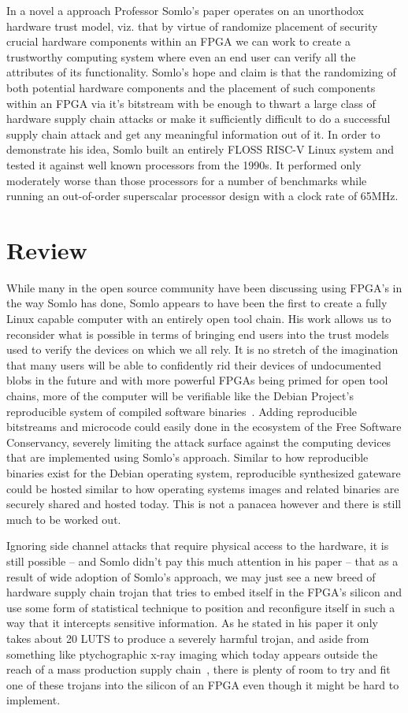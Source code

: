 \documentclass[conference]{IEEEtran}
\begin{document}
In a novel a approach Professor Somlo’s paper operates on an unorthodox hardware trust model, viz. that by virtue of randomize placement of security crucial hardware components within an FPGA we can work to create a trustworthy computing system where even an end user can verify all the attributes of its functionality. Somlo’s hope and claim is that the randomizing of both potential hardware components and the placement of such components within an FPGA via it’s bitstream with be enough to thwart a large class of hardware supply chain attacks or make it sufficiently difficult to do a successful supply chain attack and get any meaningful information out of it. In order to demonstrate his idea, Somlo built an entirely FLOSS RISC-V Linux system and tested it against well known processors from the 1990s. It performed only moderately worse than those processors for a number of benchmarks while running an out-of-order superscalar processor design with a clock rate of 65MHz.

\section{Review}
While many in the open source community have been discussing using FPGA’s in the way Somlo has done, Somlo appears to have been the first to create a fully Linux capable computer with an entirely open tool chain. His work allows us to reconsider what is possible in terms of bringing end users into the trust models used to verify the devices on which we all rely. It is no stretch of the imagination that many users will be able to confidently rid their devices of undocumented blobs in the future and with more powerful FPGAs being primed for open tool chains, more of the computer will be verifiable like the Debian Project’s reproducible system of compiled software binaries~\cite{reproducible}. Adding reproducible bitstreams and microcode could easily done in the ecosystem of the Free Software Conservancy, severely limiting the attack surface against the computing devices that are implemented using Somlo’s approach. Similar to how reproducible binaries exist for the Debian operating system, reproducible synthesized gateware could be hosted similar to how operating systems images and related binaries are securely shared and hosted today. This is not a panacea however and there is still much to be worked out.

Ignoring side channel attacks that require physical access to the hardware, it is still possible – and Somlo didn’t pay this much attention in his paper – that as a result of wide adoption of Somlo’s approach, we may just see a new breed of hardware supply chain trojan that tries to embed itself in the FPGA’s silicon and use some form of statistical technique to position and reconfigure itself in such a way that it intercepts sensitive information. As he stated in his paper it only takes about 20 LUTS to produce a severely harmful trojan, and aside from something like ptychographic x-ray imaging which today appears outside the reach of a mass production supply chain~\cite{holler}, there is plenty of room to try and fit one of these trojans into the silicon of an FPGA even though it might be hard to implement.
\end{document}
